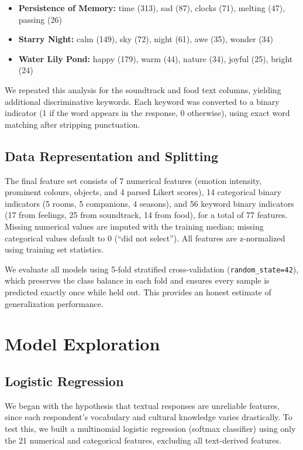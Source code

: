 \documentclass[12pt]{article}
\begin{document}
\begin{itemize}
    \item \textbf{Persistence of Memory:} time (313), sad (87), clocks (71), melting (47), passing (26)
    \item \textbf{Starry Night:} calm (149), sky (72), night (61), awe (35), wonder (34)
    \item \textbf{Water Lily Pond:} happy (179), warm (44), nature (34), joyful (25), bright (24)
\end{itemize}

We repeated this analysis for the soundtrack and food text columns, yielding additional discriminative keywords. Each keyword was converted to a binary indicator (1 if the word appears in the response, 0 otherwise), using exact word matching after stripping punctuation.

\subsection*{Data Representation and Splitting}

The final feature set consists of 7 numerical features (emotion intensity, prominent colours, objects, and 4 parsed Likert scores), 14 categorical binary indicators (5 rooms, 5 companions, 4 seasons), and 56 keyword binary indicators (17 from feelings, 25 from soundtrack, 14 from food), for a total of 77 features. Missing numerical values are imputed with the training median; missing categorical values default to 0 (``did not select''). All features are z-normalized using training set statistics.

We evaluate all models using 5-fold stratified cross-validation (\texttt{random\_state=42}), which preserves the class balance in each fold and ensures every sample is predicted exactly once while held out. This provides an honest estimate of generalization performance.

\section{Model Exploration}

\subsection*{Logistic Regression}

We began with the hypothesis that textual responses are unreliable features, since each respondent's vocabulary and cultural knowledge varies drastically. To test this, we built a multinomial logistic regression (softmax classifier) using only the 21 numerical and categorical features, excluding all text-derived features.
\end{document}
